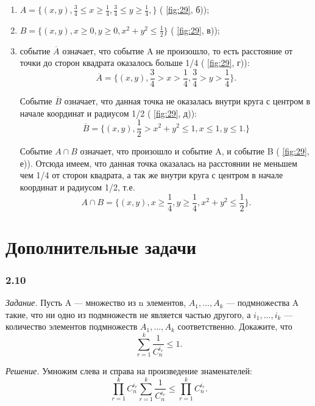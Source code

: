 \begin{enumerate}[label=\alph*)]
\item $ A = \{ (x, y), \frac{3}{4} \leq x \geq \frac{1}{4}, \frac{3}{4} \leq y \geq \frac{1}{4}, \} $ ( \ref{fig:29}, б));

\item $ B = \{ (x, y), x \geq 0, y \geq 0, x^2 + y^2 \leq \frac{1}{2} \} $ ( \ref{fig:29}, в));

\item событие $ \overline{ A } $ означает, что событие A не произошло, то есть расстояние от точки до сторон квадрата оказалось больше 1/4 ( \ref{fig:29}, г)):
$$ \overline{ A } =
\{ (x, y), \frac{3}{4} > x > \frac{1}{4},
\frac{3}{4} > y > \frac{1}{4} \}.$$

Событие $ \overline{ B } $ означает, что данная точка не оказалась внутри круга с центром в начале координат и радиусом 1/2 ( \ref{fig:29}, д)):
$$ \overline{ B } =
\{ (x, y),
\frac{1}{2} > x^2 + y^2 \leq 1,
x \leq 1,
y \leq 1. \} $$

Событие $ A \cap B $ означает, что произошло и событие A, и событие B ( \ref{fig:29}, е)).
Отсюда имеем, что данная точка оказалась на расстоянии не меньшем чем 1/4 от сторон квадрата, а так же внутри круга с центром в начале координат и радиусом 1/2, т.е.
$$ A \cap B =
\{ (x, y),
x \geq \frac{1}{4},
y \geq \frac{1}{4},
x^2 + y^2 \leq \frac{1}{2} \}.$$
\end{enumerate}

\section*{Дополнительные задачи}

\subsubsection*{2.10}

\textit{Задание.} Пусть A --- множество из n элементов,
$ A_1,  \dotsc , A_k $ --- подмножества A такие, что ни одно из подмножеств не является частью другого,
а $ i_1,  \dotsc , i_k $ --- количество элементов подмножеств $ A_1,  \dotsc , A_k $ соответственно.
Докажите, что
$$ \sum \limits_{ r = 1 }^k \frac{ 1 }{ C_n^{ i_r } } \leq 1.$$

\textit{Решение.} Умножим слева и справа на произведение знаменателей:
$$ \prod \limits_{r=1}^k C_n^{i_r} \sum \limits_{r=1}^k \frac{1}{C_n^{i_r}} \leq
\prod \limits_{r=1}^k C_n^{i_r}. $$

